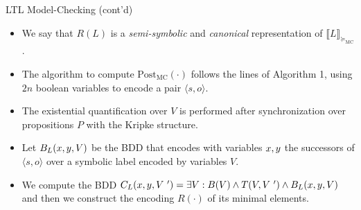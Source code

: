 \documentclass[12pt]{beamer}
\begin{document}
\begin{frame}{LTL Model-Checking (cont'd)}
	\begin{itemize}
		\item We say that $R(L)$ is a \textit{semi-symbolic} and \textit{canonical} representation of $\llbracket L \rrbracket_{\succeq_{\text{MC}}}$.
		\item The algorithm
		to compute $\text{Post}_{\text{MC}}(\cdot)$ follows the lines of Algorithm 1, using $2n$ boolean variables
		to encode a pair $\langle s, o \rangle$.
		\item The existential quantification over $V$ is performed after synchronization over propositions $P$ with the Kripke structure.
		\item Let $B_{L}(\mathnormal{x}, \mathnormal{y}, V)$ be the
		BDD that encodes with variables $\mathnormal{x}, \mathnormal{y}$ the successors of $\langle s, o \rangle$ over a symbolic label encoded by variables $V$.
		\item We compute the BDD $C_{L}(\mathnormal{x}, \mathnormal{y}, V~') = \exists V : B(V) \land T(V, V~') \land B_{L}(\mathnormal{x}, \mathnormal{y}, V)$ and then we construct the encoding $R(\cdot)$ of its minimal elements.
	\end{itemize}
\end{frame}
\end{document}
